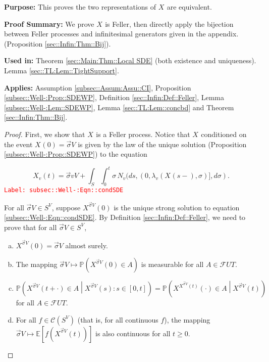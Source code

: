 \documentclass[12pt]{article}
\newcommand{\mb}{\mathbb}
\newcommand{\mc}{\mathcal}
\newcommand{\tr}{\textcolor{red}}
\newcommand{\labe}[1]{\tr{\texttt{Label: #1}}}
\newcommand{\purpose}{\textbf{Purpose: }}
\newcommand{\pfsum}{\textbf{Proof Summary: }}
\newcommand{\usein}{\textbf{Used in: }}
\newcommand{\app}{\textbf{Applies: }}
\newcommand{\pr}{\mb{P}}							%
\newcommand{\ex}[1]{\mb{E}\left[#1\right]}			%
\renewcommand{\v}{v}							%
\renewcommand{\U}{U}							%
\renewcommand{\S}{S}							%
\newcommand{\s}{\sigma}							%
\newcommand{\sv}{\vec{\s}}						%
\newcommand{\T}{T}								%
\renewcommand{\t}{t}							%
\renewcommand{\tt}{s}							%
\newcommand{\F}{\mc{F}}							%
\newcommand{\poiss}[1]{N_{#1}}						%
\newcommand{\V}{V}									%
\newcommand{\XState}[1]{\S^{#1}}				%
\newcommand{\rxvt}[2]{X_{#1}{(#2)}}					%
\newcommand{\rxvtn}[3]{X_{#1}^{#3}(#2)}				%
\newcommand{\rxvts}[2]{X_{#1}{#2}}					%
\newcommand{\rate}[1]{\lambda_{#1}}					%
\newcommand{\cont}{\mc{C}}							%
\begin{document}
\purpose This proves the two representations of \(\rxvts{}{}\) are equivalent.

\pfsum We prove \(\rxvts{}{}\) is Feller, then directly apply the bijection between Feller processes and infinitesimal generators given in the appendix. (Proposition \ref{sec::Infin:Thm::Bij}).

\usein Theorem \ref{sec::Main:Thm::Local SDE} (both existence and uniqueness). Lemma \ref{sec::TL:Lem::TightSupport}.

\app Assumption \ref{subsec::Assum:Assu::CI}, Proposition \ref{subsec::Well-:Prop::SDEWP}, Definition \ref{sec::Infin:Def::Feller}, Lemma \ref{subsec::Well-:Lem::SDEWP}, Lemma \ref{sec::TL:Lem::concbd} and Theorem \ref{sec::Infin:Thm::Bij}.

\begin{proof}
First, we show that \(\rxvts{}{}\) is a Feller process. Notice that \(\rxvts{}{}\) conditioned on the event \(\rxvt{}{0} = \sv{}{\V}\) is given by the law of the unique solution (Proposition \ref{subsec::Well-:Prop::SDEWP}) to the equation

\begin{equation}
\rxvt{\v}{\t} = \sv{\v}{\V} + \int_\S\int_0^\t \s\,\poiss{\v}(d\tt,(0,\rate{\v}(\rxvt{}{\tt-},\s)],d\s).
\label{subsec::Well-:Eqn::condSDE}
\end{equation}
\labe{subsec::Well-:Eqn::condSDE}

For all \(\sv{}{\V}\in\S^\V\), suppose \(\rxvtn{}{0}{\sv{}{\V}}\) is the unique strong solution to equation \eqref{subsec::Well-:Eqn::condSDE}. By Definition \ref{sec::Infin:Def::Feller}, we need to prove that for all \(\sv{}{\V}\in \S^\V\),

\begin{enumerate}[(a)]
\item \(\rxvtn{}{0}{\sv{}{\V}} = \sv{}{\V}\) almost surely.

\item The mapping \(\sv{}{\V}\mapsto \pr\left(\rxvtn{}{0}{\sv{}{\V}}\in A\right)\) is measurable for all \(A\in \F{\U}{\T}\).

\item \(\pr\left(\rxvtn{}{\t+\cdot}{\sv{}{\V}}\in A\middle|\rxvtn{}{\tt}{\sv{}{\V}}:\tt \in [0,\t]\right) = \pr\left(\rxvtn{}{\cdot}{\rxvtn{}{\t}{\sv{}{\V}}} \in A\middle| \rxvtn{}{\t}{\sv{}{\V}} \right)\) for all \(A \in \F{\U}{\T}\).

\item For all \(f \in \cont(\S^\V)\) (that is, for all continuous \(f\)), the mapping \(\sv{}{\V}\mapsto \ex{f(\rxvtn{}{\t}{\sv{}{\V}})}\) is also continuous for all \(t\geq 0\).
\end{enumerate}


\end{proof}
\end{document}
